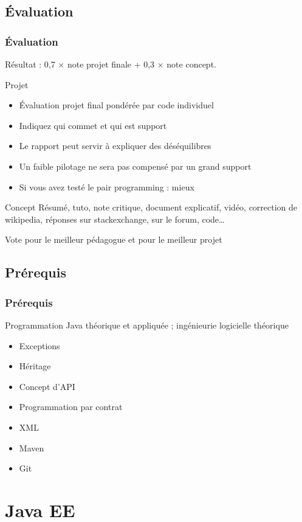 \documentclass[english, french]{beamer}
\begin{document}
\subsection{Évaluation}
\begin{frame}
	\frametitle{Évaluation}
	Résultat : 0,7 × note projet finale + 0,3 × note concept.
	\begin{block}{Projet}
		\begin{itemize}
			\item Évaluation projet final pondérée par code individuel
			\item Indiquez qui commet et qui est support
			\item Le rapport peut servir à expliquer des déséquilibres
			\item Un faible pilotage ne sera pas compensé par un grand support
			\item Si vous avez testé le pair programming : mieux
		\end{itemize}
	\end{block}
	\begin{block}{Concept}
		Résumé, tuto, note critique, document explicatif, vidéo, correction de wikipedia, réponses sur stackexchange, sur le forum, code…
	\end{block}
	Vote pour le meilleur pédagogue et pour le meilleur projet
\end{frame}

\subsection{Prérequis}
\begin{frame}
	\frametitle{Prérequis}
	Programmation Java théorique et appliquée ; ingénieurie logicielle théorique
	\begin{itemize}
		\item Exceptions
		\item Héritage
		\item Concept d’API
		\item Programmation par contrat
		\item XML
		\item Maven
		\item Git
	\end{itemize}
\end{frame}

\section{Java EE}
\end{document}
